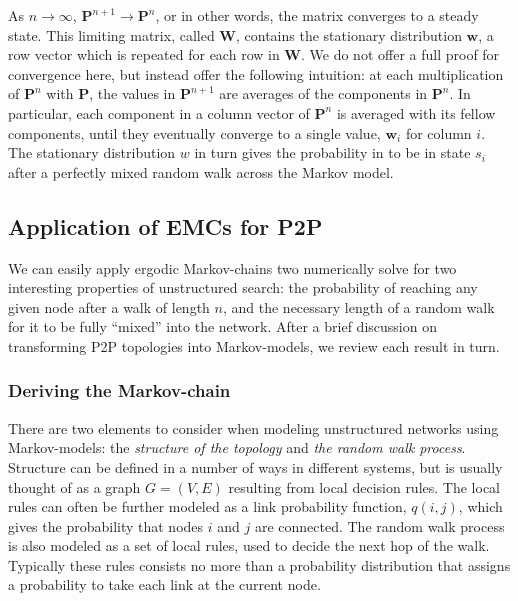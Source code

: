 \documentclass[a4paper,11pt,twocolumn]{article}
\begin{document}
As $n \rightarrow \infty$, $\textbf{P}^{n+1} \rightarrow \textbf{P}^n$, or in
other words, the matrix converges to a steady state.  This limiting matrix,
called $\textbf{W}$, contains the stationary distribution $\textbf{w}$, a row
vector which is repeated for each row in $\textbf{W}$.  We do not offer
a full proof for convergence here,
but instead offer the following intuition: at each multiplication of
$\textbf{P}^n$ with $\textbf{P}$, the values in $\textbf{P}^{n+1}$ are averages
of the components in $\textbf{P}^n$.  In particular, each component in a column
vector of $\textbf{P}^n$ is averaged with its fellow components, until they
eventually converge to a single value, $\textbf{w}_i$ for column $i$.
The stationary distribution $w$ in turn gives the probability in to be in
state $s_i$ after a perfectly mixed random walk across the Markov model.

\subsection{Application of EMCs for P2P}
\label{sec:ergodic-application}

We can easily apply ergodic Markov-chains two numerically solve for two
interesting properties of unstructured search: the probability of reaching any
given node after a walk of length $n$, and the necessary length of a random
walk for it to be fully ``mixed'' into the network.  After a brief discussion on
transforming P2P topologies into Markov-models, we review each result in turn.

\subsubsection{Deriving the Markov-chain}

There are two elements to consider when modeling unstructured networks using
Markov-models: the \emph{structure of the topology} and \emph{the random walk
process}.  Structure can be defined in a number of ways in different systems,
but is usually thought of as a graph $G = (V, E)$ resulting from local decision
rules.  The local rules can often be further modeled as a link probability
function, $q(i,j)$, which gives the probability that nodes $i$ and $j$ are
connected.  The random walk process is also modeled as a set of local rules,
used to decide the next hop of the walk.  Typically these rules consists no
more than a probability distribution that assigns a probability to take each
link at the current node.
\end{document}
